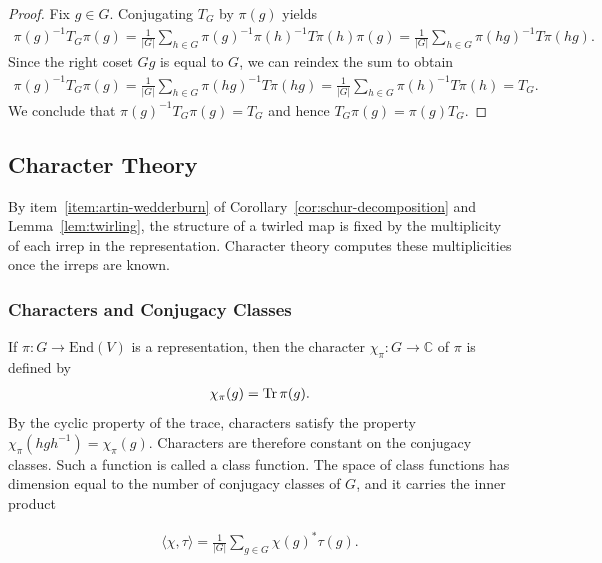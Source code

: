 \begin{proof}
    Fix $g \in G$. Conjugating $T_G$ by $\pi(g)$ yields 
    \begin{align}
        \pi(g)^{-1} T_G \pi(g) = \frac{1}{|G|} \sum_{h \in G} \pi(g)^{-1} \pi(h)^{-1} T \pi(h) \pi(g) = \frac{1}{|G|} \sum_{h \in G} \pi(hg)^{-1} T \pi(hg).
    \end{align}
    Since the right coset $Gg$ is equal to $G$, we can reindex the sum to obtain 
    \begin{align}
        \pi(g)^{-1} T_G \pi(g) = \frac{1}{|G|} \sum_{h \in G} \pi(hg)^{-1} T \pi(hg) = \frac{1}{|G|} \sum_{h \in G} \pi(h)^{-1} T \pi(h) = T_G.
    \end{align}
    We conclude that $\pi(g)^{-1} T_G \pi(g) = T_G$ and hence $T_G \pi(g) = \pi(g) T_G$.
\end{proof}

\subsection{Character Theory}\label{app:rep-characters}

By item~\ref{item:artin-wedderburn} of Corollary~\ref{cor:schur-decomposition} and Lemma~\ref{lem:twirling}, the structure of a twirled map is fixed by the multiplicity of each irrep in the representation.
Character theory computes these multiplicities once the irreps are known.

\subsubsection{Characters and Conjugacy Classes}

If $\pi : G \to \mathrm{End}(V)$ is a representation, then the character $\chi_\pi : G \to \mathbb{C}$ of $\pi$ is defined by 
\begin{align}
    \chi_\pi(g) = \operatorname{\mathrm{Tr}} \pi(g).
\end{align}
By the cyclic property of the trace, characters satisfy the property $\chi_\pi(h g h^{-1}) = \chi_\pi(g)$.
Characters are therefore constant on the conjugacy classes.
Such a function is called a class function.
The space of class functions has dimension equal to the number of conjugacy classes of $G$, and it carries the inner product

\begin{align}
    \langle \chi, \tau \rangle = \frac{1}{|G|} \sum_{g \in G} \chi(g)^* \tau(g).
\end{align}

